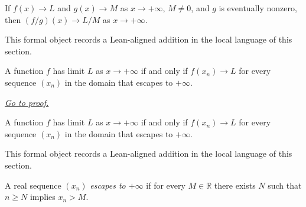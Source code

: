 \begin{remark*}
If $f(x)\to L$ and $g(x)\to M$ as $x\to+\infty$, $M\ne0$, and $g$ is eventually nonzero, then $(f/g)(x)\to L/M$ as $x\to+\infty$.
\end{remark*}

\begin{remark*}[Interpretation]
This formal object records a Lean-aligned addition in the local language of this section.
\end{remark*}

\begin{dependencies}
\NoLocalDependencies
\end{dependencies}
\begin{theorem}
\label{thm:sequential-criterion-tendsto-infty}
A function $f$ has limit $L$ as $x\to+\infty$ if and only if $f(x_n)\to L$ for every sequence $(x_n)$ in the domain that escapes to $+\infty$.

\smallskip
\noindent
\hyperref[prf:sequential-criterion-tendsto-infty]{\textit{Go to proof.}}
\end{theorem}

\begin{remark*}
A function $f$ has limit $L$ as $x\to+\infty$ if and only if $f(x_n)\to L$ for every sequence $(x_n)$ in the domain that escapes to $+\infty$.
\end{remark*}

\begin{remark*}[Interpretation]
This formal object records a Lean-aligned addition in the local language of this section.
\end{remark*}

\begin{dependencies}
\NoLocalDependencies
\end{dependencies}
\begin{definition}
\label{def:escapes-to-infty}
A real sequence $(x_n)$ \emph{escapes to $+\infty$} if for every $M\in\mathbb R$ there exists $N$ such that $n\ge N$ implies $x_n>M$.
\end{definition}

